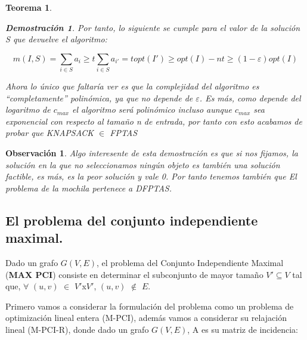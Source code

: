 \documentclass[a4paper,12pt,titlepage]{article}
\newtheorem{obs}{Observaci\'on}[section]
\newtheorem{teo}{Teorema}[section]
\newtheorem*{dem}{\textbf{Demostraci\'on}}
\begin{document}
\begin{teo}
\begin{dem}
Por tanto, lo siguiente se cumple para el valor de la soluci\'on S que devuelve el algoritmo:

\begin{equation} \label{knap:eq:7}
m(I,S) = \sum_{i\in{S}}a_i \geq t\sum_{i\in{S}}a_{i'} = t{opt}(I') \geq opt(I) - nt \geq (1-\varepsilon)opt(I)
\end{equation}

Ahora lo \'unico que faltar\'ia ver es que la complejidad del algoritmo es ``completamente'' polin\'omica, ya que no depende de $\varepsilon$. Es m\'as, como depende del logaritmo de $c_{max}$ el algoritmo ser\'a polin\'omico incluso aunque $c_{max}$ sea exponencial con respecto al tamaño n de entrada, por tanto con esto acabamos de probar que KNAPSACK $\in$ FPTAS

\end{dem}
\end{teo}

\begin{obs}

Algo interesente de esta demostraci\'on es que si nos fijamos, la soluci\'on en la que no seleccionamos ning\'un objeto es tambi\'en una soluci\'on factible, es m\'as, es la peor soluci\'on y vale 0. Por tanto tenemos tambi\'en que El problema de la mochila pertenece a DFPTAS.

\end{obs}

\subsection{El problema del conjunto independiente maximal.}\label{pciT}

Dado un grafo $G(V,E)$, el problema del Conjunto Independiente Maximal (\textbf{MAX PCI}) consiste en determinar el subconjunto de mayor tamaño $V'\subseteq V$ tal que, $\forall$ $(u,v)$ $\in$ $V'$x$V'$, $(u,v)$ $\notin$ $E$.

Primero vamos a considerar la formulaci\'on del problema como un problema de optimizaci\'on lineal entera (M-PCI), adem\'as vamos a considerar su relajaci\'on lineal (M-PCI-R), donde dado un grafo $G(V,E)$, A es su matriz de incidencia:

\vspace{\baselineskip}
\end{document}
